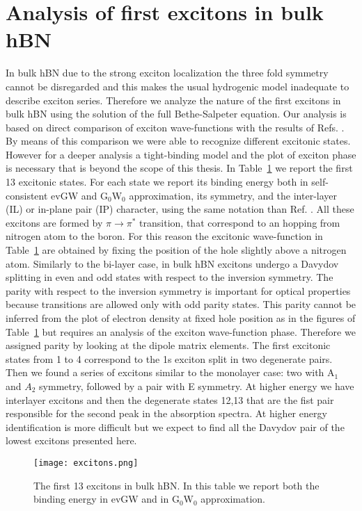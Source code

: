 \section{Analysis of first excitons in bulk hBN} \label{app:exc}
%
In bulk hBN due to the strong exciton localization the three fold symmetry cannot be disregarded and this makes the usual hydrogenic model inadequate to describe exciton series.\cite{attaccalite2018two}
Therefore we analyze the nature of the first excitons in bulk hBN using the solution of the full Bethe-Salpeter equation. Our analysis is based on direct comparison of exciton wave-functions with the results of Refs. \cite{paleari2018excitons,galvani2016excitons,attaccalite2018two}. By means of this comparison we were able  to recognize different excitonic states. However for a deeper analysis a tight-binding model and the plot of exciton phase is necessary \cite{galvani2016excitons} that is beyond the scope of this thesis. In Table~\ref{exc_table} we report the first 13 excitonic states. For each state we report its binding energy both in self-consistent evGW and G$_0$W$_0$ approximation, its symmetry, and the inter-layer (IL) or in-plane pair (IP) character, using the same notation than  Ref. \cite{galvani2016excitons}. All these excitons are formed by $\pi \rightarrow \pi^*$ transition, that correspond to an hopping from nitrogen atom to the boron. For this reason the excitonic wave-function in Table~\ref{exc_table} are obtained by fixing the position of the hole slightly above a nitrogen atom. Similarly to the bi-layer case,\cite{galvani2016excitons} in bulk hBN excitons undergo a Davydov splitting in even and odd states with respect to the inversion symmetry. The parity with respect to the inversion symmetry is important for optical properties because transitions are allowed only with odd parity states.\cite{attaccalite2018two} This parity cannot be inferred from the plot of electron density at fixed hole position as in the figures of Table~\ref{exc_table} but requires an analysis of the exciton wave-function phase. Therefore we assigned parity by looking at the dipole matrix elements.
The first excitonic states from 1 to 4 correspond to the 1s exciton split in two degenerate pairs. Then we found a series of excitons similar to the monolayer case\cite{paleari2018excitons}: two with A$_1$ and $A_2$ symmetry, followed by a pair with E symmetry. At higher energy we have interlayer excitons and then the degenerate states 12,13 that are the fist pair responsible for the second peak in the absorption spectra. At higher energy identification is more difficult but we expect to find all the Davydov pair of the lowest excitons presented here.	
\begin{figure}[H]
\centering
\texttt{[image: excitons.png]}
    \caption{The first 13 excitons in bulk hBN. In this table we report both the binding energy in evGW and in G$_0$W$_0$ approximation.}
    \label{exc_table}
\end{figure}